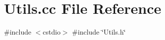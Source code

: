 \section{Utils.\+cc File Reference}
\label{Utils_8cc}
{\ttfamily \#include $<$cstdio$>$}\newline
{\ttfamily \#include \char`\"{}Utils.\+h\char`\"{}}\newline
